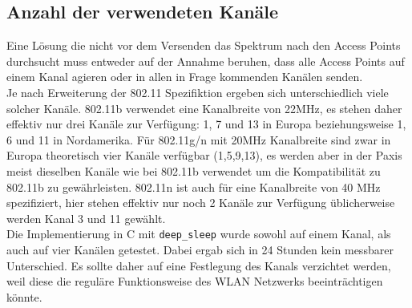 \subsection{Anzahl der verwendeten Kanäle}
Eine Lösung die nicht vor dem Versenden das Spektrum nach den Access Points durchsucht muss entweder auf der Annahme beruhen, dass alle Access Points auf einem Kanal agieren oder in allen in Frage kommenden Kanälen senden.\\
Je nach Erweiterung der 802.11 Spezifiktion ergeben sich unterschiedlich viele solcher Kanäle.
802.11b verwendet eine Kanalbreite von 22MHz, es stehen daher effektiv nur drei Kanäle zur Verfügung: 1, 7 und 13 in Europa beziehungsweise 1, 6 und 11 in Nordamerika.
Für 802.11g/n mit 20MHz Kanalbreite sind zwar in Europa theoretisch vier Kanäle verfügbar (1,5,9,13), es werden aber in der Paxis meist dieselben Kanäle wie bei 802.11b verwendet um die Kompatibilität zu 802.11b zu gewährleisten.
802.11n ist auch für eine Kanalbreite von 40 MHz spezifiziert, hier stehen effektiv nur noch 2 Kanäle zur Verfügung üblicherweise werden Kanal 3 und 11 gewählt.\\
Die Implementierung in C mit \texttt{deep\_sleep} wurde sowohl auf einem Kanal, als auch auf vier Kanälen getestet.
Dabei ergab sich in 24 Stunden kein messbarer Unterschied.
Es sollte daher auf eine Festlegung des Kanals verzichtet werden, weil diese die reguläre Funktionsweise des WLAN Netzwerks beeinträchtigen könnte.

